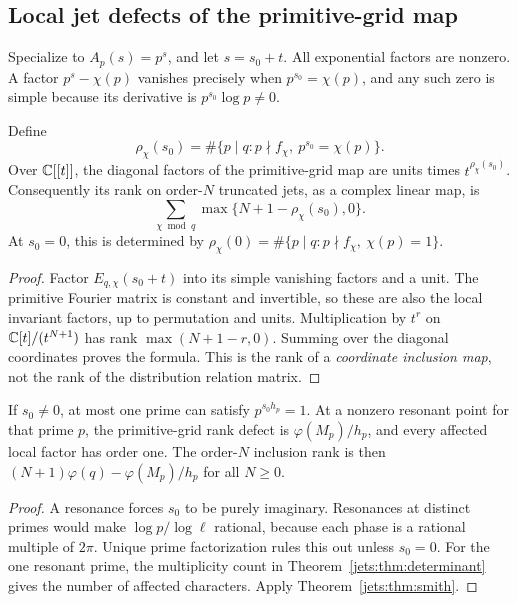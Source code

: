 \subsection{Local jet defects of the primitive-grid map}
Specialize to $A_p(s)=p^s$, and let $s=s_0+t$. All exponential factors
are nonzero. A factor $p^s-\chi(p)$ vanishes precisely when
$p^{s_0}=\chi(p)$, and any such zero is simple because its derivative
is $p^{s_0}\log p\ne0$.

\begin{theorem}\label{jets:thm:smith}
Define
\begin{equation}\label{jets:eq:rho-general}
 \rho_\chi(s_0)=\#\{p\mid q:p\nmid f_\chi,\ p^{s_0}=\chi(p)\}.
\end{equation}
Over $\mathbb C[[t]]$, the diagonal factors of the primitive-grid map are
units times $t^{\rho_\chi(s_0)}$. Consequently its rank on order-$N$
truncated jets, as a complex linear map, is
\begin{equation}\label{jets:eq:primitive-jet-rank}
 \sum_{\chi\bmod q}\max\{N+1-\rho_\chi(s_0),0\}.
\end{equation}
At $s_0=0$, this is determined by
$\rho_\chi(0)=\#\{p\mid q:p\nmid f_\chi,\ \chi(p)=1\}$.
\end{theorem}
\begin{proof}
Factor $E_{q,\chi}(s_0+t)$ into its simple vanishing factors and a unit.
The primitive Fourier matrix is constant and invertible, so these are
also the local invariant factors, up to permutation and units.
Multiplication by $t^r$ on $\mathbb C[t]/(t^{N+1})$ has rank
$\max(N+1-r,0)$. Summing over the diagonal coordinates proves the
formula. This is the rank of a \emph{coordinate inclusion map}, not
the rank of the distribution relation matrix.
\end{proof}

\begin{corollary}\label{jets:cor:central}
If $s_0\ne0$, at most one prime can satisfy
$p^{s_0h_p}=1$. At a nonzero resonant point for that prime $p$, the
primitive-grid rank defect is $\varphi(M_p)/h_p$, and every affected
local factor has order one. The order-$N$ inclusion rank is then
$(N+1)\varphi(q)-\varphi(M_p)/h_p$ for all $N\ge0$.
\end{corollary}
\begin{proof}
A resonance forces $s_0$ to be purely imaginary. Resonances at distinct
primes would make $\log p/\log\ell$ rational, because each phase is a
rational multiple of $2\pi$. Unique prime factorization rules this out
unless $s_0=0$. For the one resonant prime, the multiplicity count in
Theorem~\ref{jets:thm:determinant} gives the number of affected characters.
Apply Theorem~\ref{jets:thm:smith}.
\end{proof}

